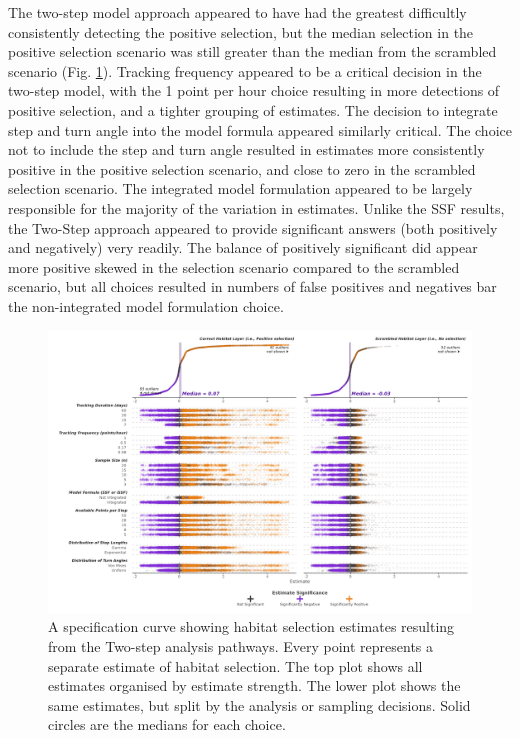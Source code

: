 \documentclass[10pt,a4paper]{article}
\begin{document}
The two-step model approach appeared to have had the greatest difficultly consistently detecting the positive selection, but the median selection in the positive selection scenario was still greater than the median from the scrambled scenario (Fig. \ref{fig:specCurveTwoStep}).
Tracking frequency appeared to be a critical decision in the two-step model, with the 1 point per hour choice resulting in more detections of positive selection, and a tighter grouping of estimates.
The decision to integrate step and turn angle into the model formula appeared similarly critical.
The choice not to include the step and turn angle resulted in estimates more consistently positive in the positive selection scenario, and close to zero in the scrambled selection scenario.
The integrated model formulation appeared to be largely responsible for the majority of the variation in estimates.
Unlike the SSF results, the Two-Step approach appeared to provide significant answers (both positively and negatively) very readily.
The balance of positively significant did appear more positive skewed in the selection scenario compared to the scrambled scenario, but all choices resulted in numbers of false positives and negatives bar the non-integrated model formulation choice.

\begin{figure}
\includegraphics[width=1\linewidth]{../figures/twoStep_specCurve} \caption{A specification curve showing habitat selection estimates resulting from the Two-step analysis pathways. Every point represents a separate estimate of habitat selection. The top plot shows all estimates organised by estimate strength. The lower plot shows the same estimates, but split by the analysis or sampling decisions. Solid circles are the medians for each choice.}\label{fig:specCurveTwoStep}
\end{figure}
\end{document}
